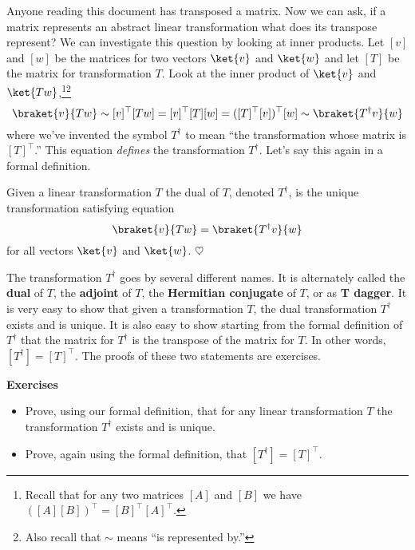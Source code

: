 Anyone reading this document has transposed a matrix.  Now we can ask, if a matrix represents an abstract linear transformation what does its transpose represent?  We can investigate this question by looking at inner products.  Let $[v]$ and $[w]$ be the matrices for two vectors $\ket{v}$ and $\ket{w}$ and let $[T]$ be the matrix for transformation $T$.  Look at the inner product of $\ket{v}$ and $\ket{Tw}$,\footnote{Recall that for any two matrices $[A]$ and $[B]$ we have $ ([A][B])^{\top} = [B]^{\top}[A]^{\top}$.}\footnote{Also recall that $\sim$ means ``is represented by.''}
\begin{displaymath} \braket{v}{Tw} \sim [v]^{\top}[Tw] = [v]^{\top}[T][w] = ([T]^{\top}[v])^{\top}[w] \sim \braket{T^{\dag}v}{w} \end{displaymath}
where we've invented the symbol $T^{\dag}$ to mean ``the transformation whose matrix is $[T]^{\top}$.''  This equation \emph{defines} the transformation $T^{\dag}$.  Let's say this again in a formal definition.
\begin{definition}
Given a linear transformation $T$ the dual of $T$, denoted $T^{\dag}$, is the unique transformation satisfying equation
\begin{displaymath} \braket{v}{Tw} = \braket{T^{\dag}v}{w} \end{displaymath}
for all vectors $\ket{v}$ and $\ket{w}$. \quad $\heartsuit$
\end{definition}
The transformation $T^{\dag}$ goes by several different names.  It is alternately called the \textbf{dual} of $T$, the \textbf{adjoint} of $T$, the \textbf{Hermitian conjugate} of $T$, or as \textbf{T dagger}.  It is very easy to show that given a transformation $T$, the dual transformation $T^{\dag}$ exists and is unique.  It is also easy to show starting from the formal definition of $T^{\dag}$ that the matrix for $T^{\dag}$ is the transpose of the matrix for $T$.  In other words, \mbox{$[T^{\dag}] = [T]^{\top}$.}  The proofs of these two statements are exercises.

\begin{flushleft}\textbf{Exercises}\end{flushleft}
\begin{itemize}
\item[1)] Prove, using our formal definition, that for any linear transformation $T$ the transformation $T^{\dag}$ exists and is unique.
\item[2)] Prove, again using the formal definition, that $[T^{\dag}] = [T]^{\top}$.
\end{itemize}

